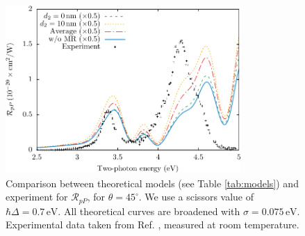 \documentclass[11pt]{book}
\begin{document}
\begin{figure}
\centering
\includegraphics[width=0.8\textwidth]{../figures/04-results/fig-4_4_14}
\caption{Comparison between theoretical models (see Table
\ref{tab:models}) and experiment for $\mathcal{R}_{pP}$, for
$\theta=45^{\circ}$. We use a scissors value of $\hbar\Delta = 0.7\,\text{eV}$.
All theoretical curves are broadened with $\sigma=0.075\,\text{eV}$.
Experimental data taken from Ref. \cite{mitchellSS01}, measured at room
temperature.}
\label{fig:mr3}
\end{figure}




\end{document}
